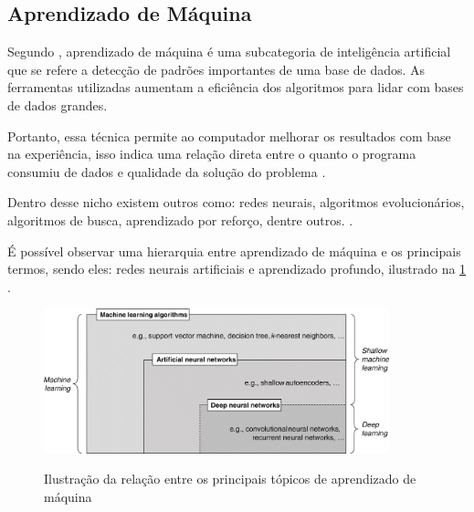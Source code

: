 \subsection{Aprendizado de Máquina}

Segundo \space{}, aprendizado de máquina é uma subcategoria de inteligência artificial que se refere  a detecção de padrões importantes de uma base de dados. As ferramentas utilizadas aumentam a eficiência dos algoritmos para lidar com bases de dados grandes.

Portanto, essa técnica permite ao computador melhorar os resultados com base na experiência, isso indica uma relação direta entre o quanto o programa consumiu de dados e qualidade da solução do problema \space\cite{ml_explicado}. 

Dentro desse nicho existem outros como: redes neurais, algoritmos evolucionários, algoritmos de busca, aprendizado por reforço, dentre outros. \space\cite{ml_oil_gas_industry}.

É possível observar uma hierarquia entre aprendizado de máquina e os principais termos, sendo eles: redes neurais artificiais e aprendizado profundo, ilustrado na \cref{fig:diagrama_ann} \space\cite{ml_and_dp}.

\begin{figure}[ht]
	\caption{Ilustração da relação entre os principais tópicos de aprendizado de máquina}
	\centering %
	\includegraphics[width=10cm]{figures/diagrama_ann.jpg} %
	\label{fig:diagrama_ann}
\end{figure}
